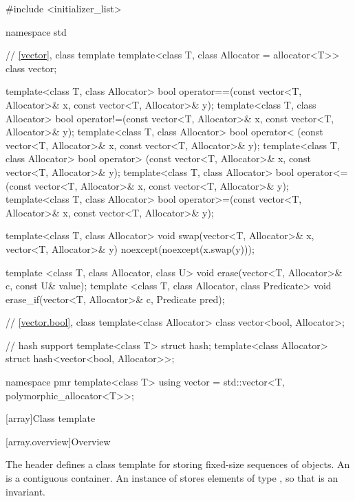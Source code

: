 \begin{codeblock}
#include <initializer_list>

namespace std {
  // \ref{vector}, class template 
  template<class T, class Allocator = allocator<T>> class vector;

  template<class T, class Allocator>
    bool operator==(const vector<T, Allocator>& x, const vector<T, Allocator>& y);
  template<class T, class Allocator>
    bool operator!=(const vector<T, Allocator>& x, const vector<T, Allocator>& y);
  template<class T, class Allocator>
    bool operator< (const vector<T, Allocator>& x, const vector<T, Allocator>& y);
  template<class T, class Allocator>
    bool operator> (const vector<T, Allocator>& x, const vector<T, Allocator>& y);
  template<class T, class Allocator>
    bool operator<=(const vector<T, Allocator>& x, const vector<T, Allocator>& y);
  template<class T, class Allocator>
    bool operator>=(const vector<T, Allocator>& x, const vector<T, Allocator>& y);

  template<class T, class Allocator>
    void swap(vector<T, Allocator>& x, vector<T, Allocator>& y)
      noexcept(noexcept(x.swap(y)));

  template <class T, class Allocator, class U>
    void erase(vector<T, Allocator>& c, const U& value);
  template <class T, class Allocator, class Predicate>
    void erase_if(vector<T, Allocator>& c, Predicate pred);

  // \ref{vector.bool}, class 
  template<class Allocator> class vector<bool, Allocator>;

  // hash support
  template<class T> struct hash;
  template<class Allocator> struct hash<vector<bool, Allocator>>;

  namespace pmr {
    template<class T>
      using vector = std::vector<T, polymorphic_allocator<T>>;
  }
}
\end{codeblock}

[array]{Class template }
%

[array.overview]{Overview}

\pnum
{}%
The header  defines a class template for storing fixed-size
sequences of objects.
An  is a contiguous container.
An instance of  stores  elements of type ,
so that  is an invariant.

